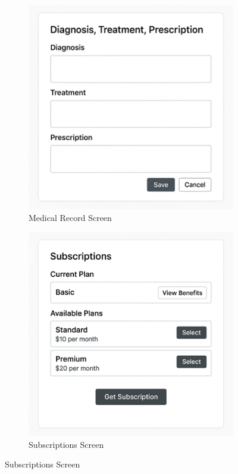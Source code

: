 \documentclass[12pt,a4paper,twoside]{book}
\begin{document}
\begin{figure}[H]
    \centering
    \begin{subfigure}[b]{0.48\textwidth}
        \centering
        \includegraphics[width=\textwidth]{Resources/Mockup Screens/Diagnosis.png}
        \caption{Medical Record Screen}\label{fig:mockup9}
    \end{subfigure}
    \hfill
    \begin{subfigure}[b]{0.48\textwidth}
        \centering
        \includegraphics[width=\textwidth]{Resources/Mockup Screens/Subscription.png}
        \caption{Subscriptions Screen}\label{fig:mockup10}
    \end{subfigure}
\end{figure}
\end{document}
